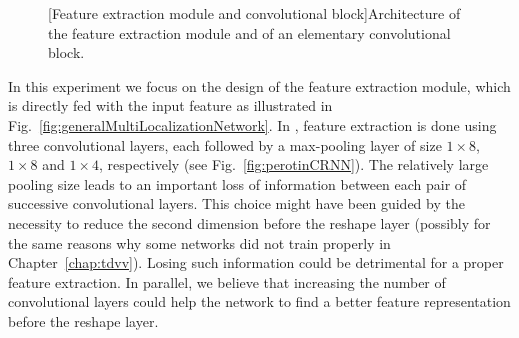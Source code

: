 \begin{figure}[t]
    \centering
    \begin{adjustbox}{width=1.\textwidth,center}
        \hspace{1cm}
    \end{adjustbox}
    
    [Feature extraction module and convolutional block]{Architecture of the feature extraction module and of an elementary convolutional block.}
    \label{fig:multiLoca_featureExtraction}
\end{figure}


In this experiment we focus on the design of the feature extraction module, which is directly fed with the input feature as illustrated in Fig.~\ref{fig:generalMultiLocalizationNetwork}. In \cite{perotin_crnn-based_2019}, feature extraction is done using three convolutional layers, each followed by a max-pooling layer of size $1 \times 8$, $1 \times 8$ and $1 \times 4$, respectively (see Fig.~\ref{fig:perotinCRNN}). The relatively large pooling size leads to an important loss of information between each pair of successive convolutional layers. This choice might have been guided by the necessity to reduce the second dimension before the reshape layer (possibly for the same reasons why some networks did not train properly in Chapter~\ref{chap:tdvv}). Losing such information could be detrimental for a proper feature extraction. In parallel, we believe that increasing the number of convolutional layers could help the network to find a better feature representation before the reshape layer.

